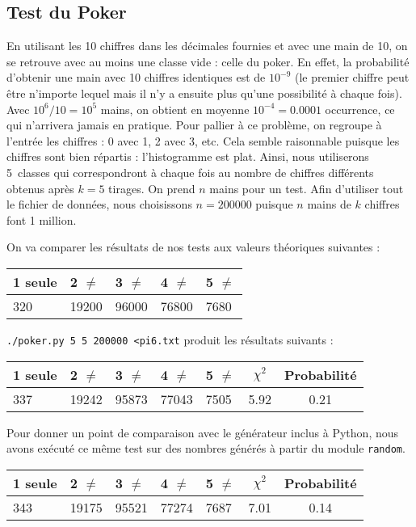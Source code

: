 \documentclass[12pt,a4paper]{article}
\begin{document}
\subsection{Test du Poker}
En utilisant les 10 chiffres dans les décimales fournies et avec une main de 10,
on se retrouve avec au moins une classe vide : celle du poker. En effet, la
probabilité d'obtenir une main avec 10 chiffres identiques est de $10^{-9}$
(le premier chiffre peut être n'importe lequel mais il n'y a ensuite plus
qu'une possibilité à chaque fois). Avec $10^6/10=10^5$ mains, on obtient en
moyenne $10^{-4}=0.0001$ occurrence, ce qui n'arrivera jamais en pratique.
Pour pallier à ce problème, on regroupe à l'entrée les chiffres : 0 avec 1,
2 avec 3, etc. Cela semble raisonnable puisque les chiffres sont bien répartis :
l'histogramme est plat. Ainsi, nous utiliserons 5~classes qui correspondront
à chaque fois au nombre de chiffres différents obtenus après $k=5$ tirages.
On prend $n$ mains pour un test. Afin d'utiliser tout le fichier de données,
nous choisissons $n=200000$ puisque $n$ mains de $k$ chiffres font 1 million.

On va comparer les résultats de nos tests aux valeurs théoriques suivantes :
\begin{center}
\begin{tabular}{l|l|l|l|l}
1 seule & 2 $\neq$ & 3 $\neq$ & 4 $\neq$ & 5 $\neq$ \\ \hline
320 & 19200 & 96000 & 76800 & 7680
\end{tabular}
\end{center}

\texttt{./poker.py 5 5 200000 <pi6.txt} produit les résultats suivants :
\begin{center}
\begin{tabular}{l|l|l|l|l|c|c}
1 seule & 2 $\neq$ & 3 $\neq$ & 4 $\neq$ & 5 $\neq$
	& $\chi^2$ & Probabilité \\ \hline
337 & 19242 & 95873 & 77043 & 7505 &  5.92 &  0.21
\end{tabular}
\end{center}

Pour donner un point de comparaison avec le générateur inclus à Python,
nous avons
exécuté ce même test sur des nombres générés à partir du module \texttt{random}.

\begin{center}
\begin{tabular}{l|l|l|l|l|c|c}
1 seule & 2 $\neq$ & 3 $\neq$ & 4 $\neq$ & 5 $\neq$
	& $\chi^2$ & Probabilité \\ \hline
343 & 19175 & 95521 & 77274 & 7687 &  7.01 &  0.14
\end{tabular}
\end{center}
\end{document}
